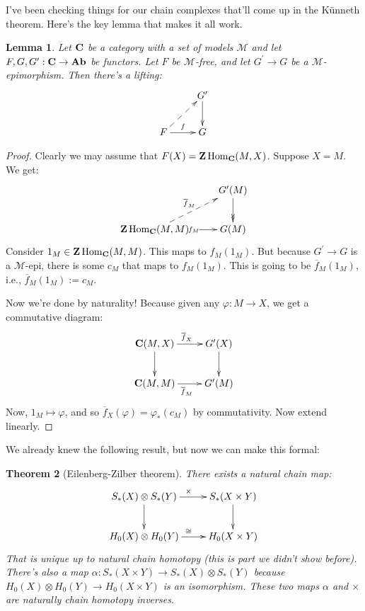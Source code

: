 \documentclass{amsart}
\theoremstyle{theorem}
\newtheorem{theorem}{Theorem}[section]
\newtheorem{lemma}[theorem]{Lemma}
\theoremstyle{definition}
\DeclareMathOperator{\Hom}{Hom}
\def\MM{\mathscr M}\def\NN{\mathbb N}\def\OO{\mathbb O}\def\PP{\mathbb P}
\newcommand{\Z}{\mathbf Z}
\begin{document}
I've been checking things for our chain complexes that'll come up in the K\"{u}nneth theorem. Here's the key lemma that makes it all work.
\begin{lemma}
Let $\mathbf C$ be a category with a set of models $\MM$ and let $F,G,G^\prime:\mathbf C\to\mathbf{Ab}$ be functors. Let $F$ be $\MM$-free, and let $G^\prime\to G$ be a $\MM$-epimorphism. Then there's a lifting:
\begin{equation*}
\xymatrix{ & G^\prime\ar[d]\\
F\ar@{-->}[ur]\ar[r]^f & G}
\end{equation*}
\end{lemma}
\begin{proof}
Clearly we may assume that $F(X)=\Z\Hom_\cc(M,X)$. Suppose $X=M$. We get:
\begin{equation*}
\xymatrix{ & G^\prime(M)\ar@{->>}[d]\\
\Z\Hom_\cc(M,M)\ar@{-->}[ur]^{\overline{f}_M}\ar[r]|{f_M} & G(M)}
\end{equation*}
Consider $1_M\in\Z\Hom_\cc(M,M)$. This maps to $f_M(1_M)$. But because $G^\prime\to G$ is a $\MM$-epi, there is some $c_M$ that maps to $f_M(1_M)$. This is going to be $\overline{f}_M(1_M)$, i.e., $\overline{f}_M(1_M):=c_M$.

Now we're done by naturality! Because given any $\varphi:M\to X$, we get a commutative diagram:
\begin{equation*}
\xymatrix{\cc(M,X)\ar[r]^{\overline{f}_X}\ar[d] & G^\prime(X)\ar[d]\\
\cc(M,M)\ar[r]_{\overline{f}_M} & G^\prime(M)}
\end{equation*}
Now, $1_M\mapsto\varphi$, and so $\overline{f}_X(\varphi)=\varphi_\ast(c_M)$ by commutativity. Now extend linearly.
\end{proof}
We already knew the following result, but now we can make this formal:
\begin{theorem}[Eilenberg-Zilber theorem]
There exists a natural chain map:
\begin{equation*}
\xymatrix{S_\ast(X)\otimes S_\ast(Y)\ar[r]^{\times}\ar[d] & S_\ast(X\times Y)\ar[d]\\
 H_0(X)\otimes H_0(Y)\ar[r]^{\cong} & H_0(X\times Y)}
\end{equation*}
That is unique up to natural chain homotopy (this is part we didn't show before). There's also a map $\alpha:S_\ast(X\times Y)\to S_\ast(X)\otimes S_\ast(Y)$ because $ H_0(X)\otimes H_0(Y)\to H_0(X\times Y)$ is an isomorphism. These two maps $\alpha$ and $\times$ are naturally chain homotopy inverses.
\end{theorem}
\end{document}
